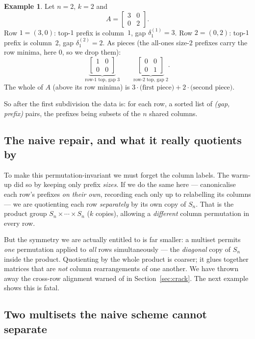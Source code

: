 \documentclass[11pt,a4paper]{article}
\theoremstyle{definition}
\newtheorem{example}[definition]{Example}
\theoremstyle{plain}
\newcommand{\Sn}{S_n}
\begin{document}
\begin{example}\label{ex:firstsd}
Let $n=2$, $k=2$ and
\[
   A=\begin{bmatrix}3&0\\[1pt]0&2\end{bmatrix}.
\]
Row $1=(3,0)$: top-$1$ prefix is column~$1$, gap $\delta^{(1)}_1=3$. Row
$2=(0,2)$: top-$1$ prefix is column~$2$, gap $\delta^{(2)}_1=2$. As pieces (the
all-ones size-$2$ prefixes carry the row minima, here $0$, so we drop them):
\[
  \underbrace{\begin{bmatrix}1&0\\0&0\end{bmatrix}}_{\text{row-1 top, gap }3}
  \qquad
  \underbrace{\begin{bmatrix}0&0\\0&1\end{bmatrix}}_{\text{row-2 top, gap }2}.
\]
The whole of $A$ (above its row minima) is $3\cdot\text{(first piece)}+2\cdot
\text{(second piece)}$.
\end{example}

So after the first subdivision the data is: for each row, a sorted list of
\emph{(gap, prefix)} pairs, the prefixes being subsets of the $n$ shared
columns.

\subsection{The naive repair, and what it really quotients by}

To make this permutation-invariant we must forget the column labels. The
warm-up did so by keeping only prefix \emph{sizes}. If we do the same here ---
canonicalise each row's prefixes \emph{on their own}, recording each only up to
relabelling its columns --- we are quotienting each row \emph{separately} by its
own copy of $\Sn$. That is the product group $\Sn\times\cdots\times\Sn$ ($k$
copies), allowing a \emph{different} column permutation in every row.

But the symmetry we are actually entitled to is far smaller: a multiset permits
\emph{one} permutation applied to \emph{all} rows simultaneously --- the
\emph{diagonal} copy of $\Sn$ inside the product. Quotienting by the whole
product is coarser; it glues together matrices that are \emph{not} column
rearrangements of one another. We have thrown away the cross-row alignment
warned of in Section~\ref{sec:crack}. The next example shows this is fatal.

\subsection{Two multisets the naive scheme cannot separate}
\end{document}
